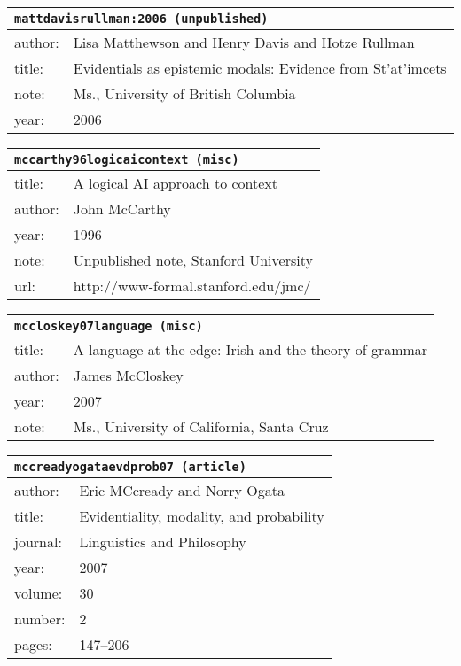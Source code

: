 \documentclass{article}
\begin{document}
\bigskip

\begin{tabular}{p{}p{}}
\multicolumn{2}{l}{\texttt{mattdavisrullman:2006 (unpublished)}}\\
\hline
author: & Lisa Matthewson and Henry Davis and Hotze Rullman\\
title: & Evidentials as epistemic modals: Evidence from St'at'imcets\\
note: & \textsc{M}s., University of British Columbia\\
year: & 2006\\
\end{tabular}

\bigskip

\begin{tabular}{p{}p{}}
\multicolumn{2}{l}{\texttt{mccarthy96logicaicontext (misc)}}\\
\hline
title: & A logical \textsc{AI} approach to context\\
author: & John McCarthy\\
year: & 1996\\
note: & \textsc{U}npublished note, Stanford University\\
url: & http://www-formal.stanford.edu/jmc/\\
\end{tabular}

\bigskip

\begin{tabular}{p{}p{}}
\multicolumn{2}{l}{\texttt{mccloskey07language (misc)}}\\
\hline
title: & A language at the edge: Irish and the theory of grammar\\
author: & James McCloskey\\
year: & 2007\\
note: & \textsc{M}s., University of California, Santa Cruz \\
\end{tabular}

\bigskip

\begin{tabular}{p{}p{}}
\multicolumn{2}{l}{\texttt{mccreadyogataevdprob07 (article)}}\\
\hline
author: & Eric MCcready and Norry Ogata\\
title: & Evidentiality, modality, and probability\\
journal: & Linguistics and Philosophy\\
year: & 2007\\
volume: & 30\\
number: & 2\\
pages: & 147--206\\
\end{tabular}
\end{document}
